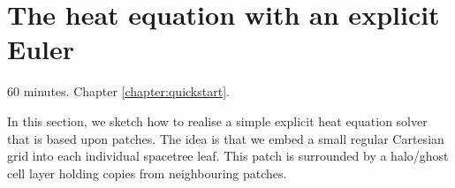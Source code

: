 \section{The heat equation with an explicit Euler}


\chapterDescription
  {
    60 minutes.
  }
  {
    Chapter \ref{chapter:quickstart}.
  }

In this section, we sketch how to realise a simple explicit heat equation
solver that is based upon patches.
The idea is that we embed a small regular Cartesian grid into each individual
spacetree leaf.
This patch is surrounded by a halo/ghost cell layer holding copies from
neighbouring patches.
